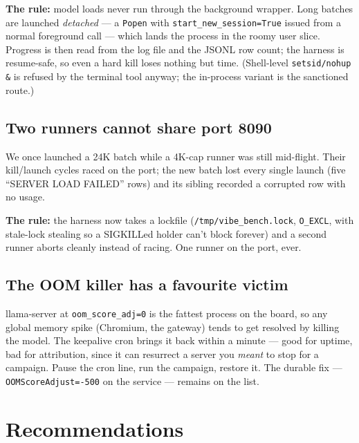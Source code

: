 \documentclass[11pt,a4paper]{article}
\begin{document}
\textbf{The rule:} model loads never run through the background wrapper.
Long batches are launched \emph{detached} --- a \texttt{Popen} with
\texttt{start\_new\_session=True} issued from a normal foreground call ---
which lands the process in the roomy user slice. Progress is then read from
the log file and the JSONL row count; the harness is resume-safe, so even a
hard kill loses nothing but time. (Shell-level \texttt{setsid/nohup \&} is
refused by the terminal tool anyway; the in-process variant is the
sanctioned route.)

\subsection{Two runners cannot share port 8090}

We once launched a 24K batch while a 4K-cap runner was still mid-flight.
Their kill/launch cycles raced on the port; the new batch lost every single
launch (five ``SERVER LOAD FAILED'' rows) and its sibling recorded a
corrupted row with no usage.

\textbf{The rule:} the harness now takes a lockfile
(\texttt{/tmp/vibe\_bench.lock}, \texttt{O\_EXCL}, with
stale-lock stealing so a SIGKILLed holder can't block forever) and a
second runner aborts cleanly instead of racing. One runner on the port, ever.

\subsection{The OOM killer has a favourite victim}

llama-server at \texttt{oom\_score\_adj=0} is the fattest process on the
board, so any global memory spike (Chromium, the gateway) tends to get
resolved by killing the model. The keepalive cron brings it back within a
minute --- good for uptime, bad for attribution, since it can resurrect a
server you \emph{meant} to stop for a campaign. Pause the cron line, run
the campaign, restore it. The durable fix --- \texttt{OOMScoreAdjust=-500}
on the service --- remains on the list.

\section{Recommendations}
\end{document}

